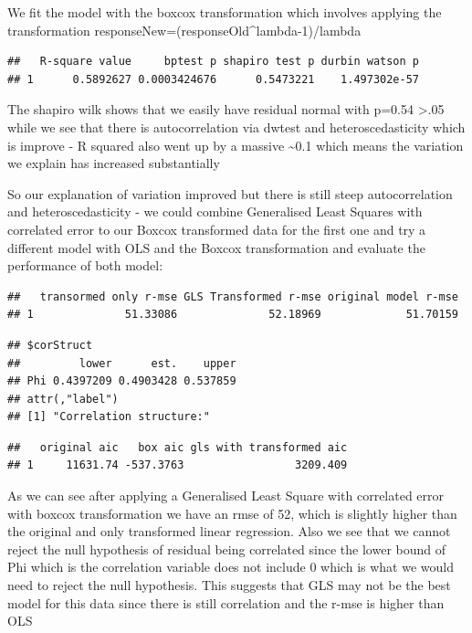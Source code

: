 \documentclass[
]{report}
\begin{document}
We fit the model with the boxcox transformation which involves applying
the transformation responseNew=(responseOld\^{}lambda-1)/lambda

\begin{verbatim}
##   R-square value     bptest p shapiro test p durbin watson p
## 1      0.5892627 0.0003424676      0.5473221    1.497302e-57
\end{verbatim}

The shapiro wilk shows that we easily have residual normal with p=0.54
\textgreater.05 while we see that there is autocorrelation via dwtest
and heteroscedasticity which is improve - R squared also went up by a
massive \textasciitilde0.1 which means the variation we explain has
increased substantially

So our explanation of variation improved but there is still steep
autocorrelation and heteroscedasticity - we could combine Generalised
Least Squares with correlated error to our Boxcox transformed data for
the first one and try a different model with OLS and the Boxcox
transformation and evaluate the performance of both model:

\begin{verbatim}
##   transormed only r-mse GLS Transformed r-mse original model r-mse
## 1              51.33086              52.18969             51.70159
\end{verbatim}

\begin{verbatim}
## $corStruct
##         lower      est.    upper
## Phi 0.4397209 0.4903428 0.537859
## attr(,"label")
## [1] "Correlation structure:"
\end{verbatim}

\begin{verbatim}
##   original aic   box aic gls with transformed aic
## 1     11631.74 -537.3763                 3209.409
\end{verbatim}

As we can see after applying a Generalised Least Square with correlated
error with boxcox transformation we have an rmse of 52, which is
slightly higher than the original and only transformed linear
regression. Also we see that we cannot reject the null hypothesis of
residual being correlated since the lower bound of Phi which is the
correlation variable does not include 0 which is what we would need to
reject the null hypothesis. This suggests that GLS may not be the best
model for this data since there is still correlation and the r-mse is
higher than OLS
\end{document}
